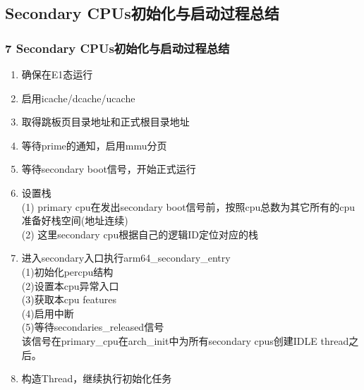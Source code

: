 \documentclass[
8pt, %
]{beamer}
\begin{document}
	\subsection{Secondary CPUs初始化与启动过程总结}

	\begin{frame}
		\frametitle{7 Secondary CPUs初始化与启动过程总结}
		\begin{enumerate}
			\item 确保在E1态运行
			\item 启用icache/dcache/ucache
			\item 取得跳板页目录地址和正式根目录地址
			\item 等待prime的通知，启用mmu分页
			\item 等待secondary boot信号，开始正式运行
			\item 设置栈\\
			(1) primary cpu在发出secondary boot信号前，按照cpu总数为其它所有的cpu准备好栈空间(地址连续)\\
			(2) 这里secondary cpu根据自己的逻辑ID定位对应的栈\\
			\item 进入secondary入口执行arm64\_secondary\_entry\\
			(1)初始化percpu结构\\
			(2)设置本cpu异常入口\\
			(3)获取本cpu features\\
			(4)启用中断\\
			(5)等待secondaries\_released信号\\
			该信号在primary\_cpu在arch\_init中为所有secondary cpus创建IDLE thread之后。
			\item 构造Thread，继续执行初始化任务
		\end{enumerate}
	\end{frame}
\end{document}
